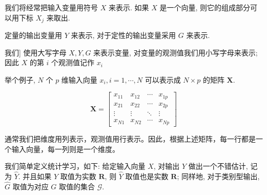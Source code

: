 \documentclass[UTF8]{ctexart}
\begin{document}
	我们将经常把输入变量用符号 $X$ 来表示. 如果 $X$ 是一个向量, 则它的组成部分可以用下标 $X_{j}$ 来取出. 
	
	定量的输出变量用 $Y$ 来表示, 对于定性的输出变量采用 $G$ 来表示. 
	
	我们] 使用大写字母 $X, Y, G$ 来表示变量, 对变量的观测值我们用小写字母来表示; 因此 $X$ 的第 $i$ 个观测值记作 $x_{i}$ 
	
	举个例子, $N$ 个 $p$ 维输入向量 $x_{i}, i=1, \cdots, N$ 可以表示成 $N \times p$ 的矩阵 $\mathbf{X}$. 
	
	\begin{equation}
		\mathbf{X}=\left[\begin{array}{cccc}
			x_{11} & x_{12} & \cdots & x_{1 p} \\
			x_{21} & x_{22} & \cdots & x_{2 p} \\
			\vdots & \vdots & \ddots & \vdots \\
			x_{N 1} & x_{N 2} & \cdots & x_{N p}
		\end{array}\right]
	\end{equation}
	
	通常我们把维度用列表示，观测值用行表示。因此，根据上述矩阵，每一行都是一个输入向量，每一列则是一个维度。
	
	我们简单定义统计学习，如下: 给定输入向量 $X$, 对输出 $Y$ 做出一个不错估计, 记为 $\hat{Y}$. 并且如果 $Y$ 取值为实数 $\mathbf{R}$, 则 $\hat{Y}$ 取值也是实数 $\mathbf{R}$; 同样地, 对于类别型输出, $\hat{G}$ 取值为对应 $G$ 取值的集合 $\mathcal{G}$.
	
\end{document}
